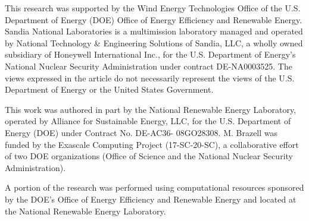 \documentclass[conf]{new-aiaa}
\begin{document}
This research was supported by the Wind Energy Technologies Office of the
U.S. Department of Energy (DOE) Office of Energy Efficiency and Renewable
Energy.  Sandia National Laboratories is a multimission laboratory managed and
operated by National Technology \& Engineering Solutions of Sandia, LLC, a
wholly owned subsidiary of Honeywell International Inc., for the U.S. Department
of Energy's National Nuclear Security Administration under contract
DE-NA0003525. The views expressed in the article do not necessarily represent
the views of the U.S. Department of Energy or the United States Government.

This work was authored in part by the National Renewable Energy Laboratory,
operated by Alliance for Sustainable Energy, LLC, for the U.S. Department of
Energy (DOE) under Contract No. DE-AC36- 08GO28308. M. Brazell was funded by the
Exascale Computing Project (17-SC-20-SC), a collaborative effort of two DOE
organizations (Office of Science and the National Nuclear Security
Administration).

A portion of the research was performed using computational resources sponsored
by the DOE's Office of Energy Efficiency and Renewable Energy and located at the
National Renewable Energy Laboratory.


\end{document}
